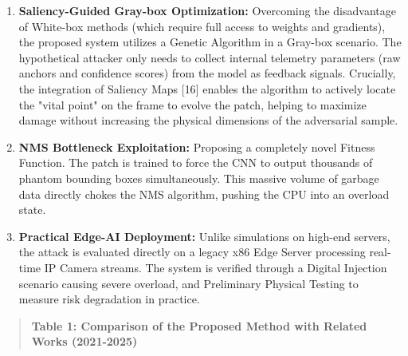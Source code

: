 \documentclass[]{article}
\begin{document}
\begin{enumerate}
\def\labelenumi{\arabic{enumi}.}
\item
  \textbf{Saliency-Guided Gray-box Optimization:} Overcoming the disadvantage of White-box methods (which require full access to weights and gradients), the proposed system utilizes a Genetic Algorithm in a Gray-box scenario. The hypothetical attacker only needs to collect internal telemetry parameters (raw anchors and confidence scores) from the model as feedback signals. Crucially, the integration of Saliency Maps {[}16{]} enables the algorithm to actively locate the "vital point" on the frame to evolve the patch, helping to maximize damage without increasing the physical dimensions of the adversarial sample.
\item
  \textbf{NMS Bottleneck Exploitation:} Proposing a completely novel Fitness Function. The patch is trained to force the CNN to output thousands of phantom bounding boxes simultaneously. This massive volume of garbage data directly chokes the NMS algorithm, pushing the CPU into an overload state.
\item
  \textbf{Practical Edge-AI Deployment:} Unlike simulations on high-end servers, the attack is evaluated directly on a legacy x86 Edge Server processing real-time IP Camera streams. The system is verified through a Digital Injection scenario causing severe overload, and Preliminary Physical Testing to measure risk degradation in practice.
\end{enumerate}

\begin{quote}
\textbf{Table 1: Comparison of the Proposed Method with Related Works (2021-2025)}
\end{quote}
\end{document}
